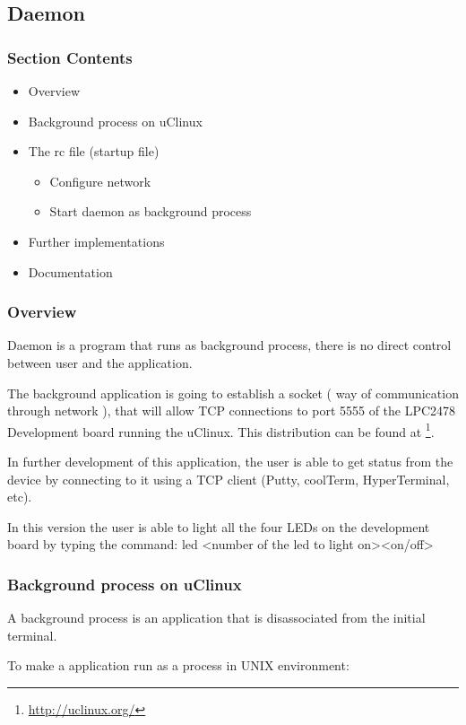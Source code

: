 \subsection{Daemon}
\subsubsection{Section Contents}
\begin{itemize}
	\item Overview
	\item Background process on uClinux
	\item The rc file (startup file)
	\begin{itemize}
		\item Configure network
		\item Start daemon as background process
	\end{itemize}
	\item Further implementations
	\item Documentation
\end{itemize}

\subsubsection{Overview}
Daemon is a program that runs as background process, there is no direct control between user and the application.

The background application is going to establish a socket ( way of communication through network ), that will allow TCP connections to port 5555 of the LPC2478 Development board running the uClinux. This distribution can be found at \footnote{\url{http://uclinux.org/}}.

In further development of this application, the user is able to get status from the device by connecting to it using a TCP client (Putty, coolTerm, HyperTerminal, etc).

In this version the user is able to light all the four LEDs on the development board by typing the command: led \textless number of the led to light on\textgreater  \textless on/off\textgreater

\subsubsection{Background process on uClinux}
A background process is an application that is disassociated from the initial terminal. 

To make a application run as a process in UNIX environment:

